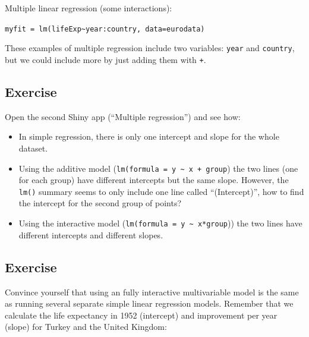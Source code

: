 \documentclass[]{book}
\makeatletter
\newenvironment{Shaded}{\begin{snugshade}}{\end{snugshade}}
\newcommand{\KeywordTok}[1]{\textcolor[rgb]{0.13,0.29,0.53}{\textbf{#1}}}
\newcommand{\DataTypeTok}[1]{\textcolor[rgb]{0.13,0.29,0.53}{#1}}
\newcommand{\DecValTok}[1]{\textcolor[rgb]{0.00,0.00,0.81}{#1}}
\newcommand{\StringTok}[1]{\textcolor[rgb]{0.31,0.60,0.02}{#1}}
\newcommand{\OperatorTok}[1]{\textcolor[rgb]{0.81,0.36,0.00}{\textbf{#1}}}
\newcommand{\NormalTok}[1]{#1}
\providecommand{\tightlist}{%
  \setlength{\itemsep}{0pt}\setlength{\parskip}{0pt}}
\newenvironment{kframe}{%
\medskip{}
\setlength{\fboxsep}{.8em}
 \def\at@end@of@kframe{}%
 \ifinner\ifhmode%
  \def\at@end@of@kframe{\end{minipage}}%
  \begin{minipage}{\columnwidth}%
 \fi\fi%
 \def\FrameCommand##1{\hskip\@totalleftmargin \hskip-\fboxsep
 \colorbox{shadecolor}{##1}\hskip-\fboxsep
     \hskip-\linewidth \hskip-\@totalleftmargin \hskip\columnwidth}%
 \MakeFramed {\advance\hsize-\width
   \@totalleftmargin\z@ \linewidth\hsize
   \@setminipage}}%
 {\par\unskip\endMakeFramed%
 \at@end@of@kframe}
\renewenvironment{Shaded}{\begin{kframe}}{\end{kframe}}
\makeatother
\begin{document}
Multiple linear regression (some interactions):

\texttt{myfit\ =\ lm(lifeExp\textasciitilde{}year:country,\ data=eurodata)}

These examples of multiple regression include two variables:
\texttt{year} and \texttt{country}, but we could include more by just
adding them with \texttt{+}.

\subsection{Exercise}\label{exercise-38}

Open the second Shiny app (``Multiple regression'') and see how:

\begin{itemize}
\tightlist
\item
  In simple regression, there is only one intercept and slope for the
  whole dataset.
\item
  Using the additive model
  (\texttt{lm(formula\ =\ y\ \textasciitilde{}\ x\ +\ group}) the two
  lines (one for each group) have different intercepts but the same
  slope. However, the \texttt{lm()} summary seems to only include one
  line called ``(Intercept)'', how to find the intercept for the second
  group of points?
\item
  Using the interactive model
  (\texttt{lm(formula\ =\ y\ \textasciitilde{}\ x*group})) the two lines
  have different intercepts and different slopes.
\end{itemize}

\subsection{Exercise}\label{exercise-39}

Convince yourself that using an fully interactive multivariable model is
the same as running several separate simple linear regression models.
Remember that we calculate the life expectancy in 1952 (intercept) and
improvement per year (slope) for Turkey and the United Kingdom:

\begin{Shaded}
\end{Shaded}
\end{document}
